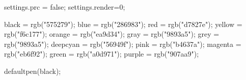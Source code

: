 \makeatletter

\newcommand{\tendsto}[1]{\xrightarrow[#1]{}}
\newcommand{\danger}{{\large\fontencoding{U}\fontfamily{futs}\selectfont\char 66\relax}\;}
\newcommand{\ex}{\fbox{ex}\;}

\newcommand{\vrt}[1]{\rotatebox{90}{$#1$}}
\newcommand{\avrt}[1]{\rotatebox{-90}{$#1$}}

\renewcommand{\title}[3]{
	\AtBeginDocument{
		\begin{titlepage}
			\begin{center}
				\vspace{10cm}
				{\Large \sc #1}\\
				\vspace{1cm}
				{\HUGE \cursive #2}\\
				\vfill
				#3\\
				\vspace{1.5mm}
				\rule{4cm}{0.4pt}\\
				\vspace{3.5mm}
				MP2I\\
			\end{center}
		\end{titlepage}
	}
}

\begin{asydef}
	settings.prc = false;
	settings.render=0;

	black = rgb("575279");
	blue = rgb("286983");
	red = rgb("d7827e");
	yellow = rgb("f6c177");
	orange = rgb("ea9d34");
	gray = rgb("9893a5");
	grey = rgb("9893a5");
	deepcyan = rgb("56949f");
	pink = rgb("b4637a");
	magenta = rgb("eb6f92");
	green = rgb("a0d971");
	purple = rgb("907aa9");

	defaultpen(black);
\end{asydef}

